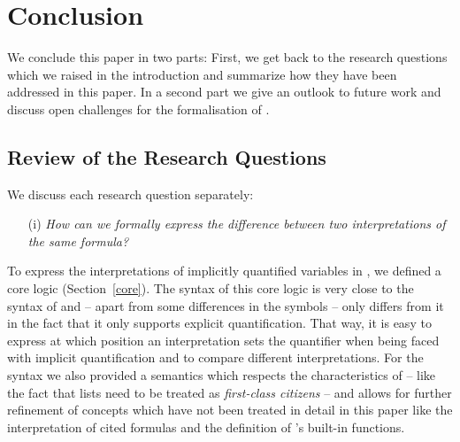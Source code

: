 \section{Conclusion}\label{sec:concl}
We conclude this paper in two parts: First, we get back to the research questions which we raised in the introduction and 
summarize how they have been addressed in this paper. In a second part we give an outlook to future work and 
discuss open challenges for the formalisation of \nthreelogic.


\subsection{Review of the Research Questions}
We discuss each research question separately:
\begin{enumerate}
 \item[(i)] \emph{How can we formally express the difference between two interpretations of the same \nthree formula?}
 \end{enumerate}
 To express the interpretations of implicitly quantified variables in \nthreelogic, we defined a core logic (Section~\ref{core}). The syntax of this 
 core logic is very close to the syntax of \nthree and -- apart from some differences in the symbols -- only differs from it in the fact 
 that it only supports explicit 
 quantification. That way, it is easy to express at which position an interpretation sets the quantifier when being faced with implicit quantification
 and to compare different interpretations. 
 For the syntax we also provided a semantics which respects the characteristics 
 of \nthree{} -- like the fact that lists need to be treated as \emph{first-class citizens} -- and allows for further refinement of concepts which have
 not been treated in detail in this paper like the interpretation 
of cited formulas and the definition of \nthree's built-in functions.

